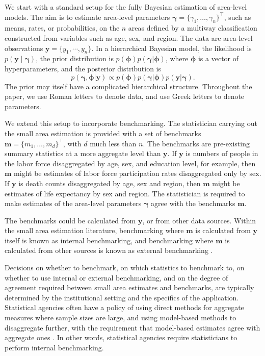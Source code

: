 \documentclass[12pt]{article}
\begin{document}
We start with a standard setup for the fully Bayesian estimation of area-level models. The aim is to estimate area-level parameters $\bm{\gamma} = \{\gamma_1, \dots, \gamma_n\}^{\top}$, such as means, rates, or probabilities, on the $n$ areas defined by a multiway classification constructed from variables such as age, sex, and region.  The data are area-level observations $\bm{y}=\{y_1,\cdots,y_n\}$.  In a hierarchical Bayesian model, the likelihood is $p(\bm{y}\mid\bm{\gamma})$, the prior distribution is $p(\bm{\phi}) p(\bm{\gamma} | \bm{\phi})$, where $\bm{\phi}$ is a vector of hyperparameters, and the posterior distribution is
\begin{equation}
  p(\bm{\gamma}, \bm{\phi} |\bm{y})\propto p(\bm{\phi}) p(\bm{\gamma} | \bm{\phi}) p(\bm{y} | \bm{\gamma}). \label{eq:unbenchmarked_posterior}
\end{equation}
The prior may itself have a complicated hierarchical structure. Throughout the paper, we use Roman letters to denote data, and use Greek letters to denote parameters.

We extend this setup to incorporate benchmarking.  The statistician carrying out the small area estimation is provided with a set of benchmarks $\bm{m} = \{m_1, \dots, m_d\}^{\top}$, with $d$ much less than $n$. The benchmarks are pre-existing summary statistics at a more aggregate level than $\bm{y}$.   If $\bm{y}$ is numbers of people in the labor force disaggregated by age, sex, and education level, for example, then $\bm{m}$ might be estimates of labor force participation rates disaggregated only by sex.  If $\bm{y}$ is death counts disaggregated by age, sex and region, then $\bm{m}$ might be estimates of life expectancy by sex and region.  The statistician is required to make estimates of the area-level parameters $\bm{\gamma}$ agree with the benchmarks $\bm{m}$.

The benchmarks could be calculated from $\bm{y}$, or from other data sources.  Within the small area estimation literature, benchmarking where $\bm{m}$ is calculated from $\bm{y}$ itself is known as internal benchmarking, and benchmarking where $\bm{m}$ is calculated from other sources is known as external benchmarking \citep[e.g.][]{bell2013benchmarking}.

Decisions on whether to benchmark, on which statistics to benchmark to, on whether to use internal or external benchmarking, and on the degree of agreement required between small area estimates and benchmarks, are typically determined by the institutional setting and the specifics of the application. Statistical agencies often have a policy of using direct methods for aggregate measures where sample sizes are large, and using model-based methods to disaggregate further, with the requirement that model-based estimates agree with aggregate ones \citep{little2012calibrated}.  In other words, statistical agencies require statisticians to perform internal benchmarking.
\end{document}
